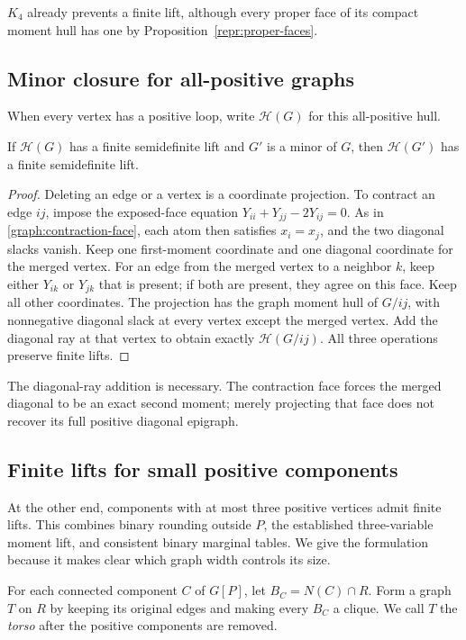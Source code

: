 $K_4$ already prevents a finite lift, although every proper face of its
compact moment hull has one by Proposition~\ref{repr:proper-faces}.

\subsection{Minor closure for all-positive graphs}

When every vertex has a positive loop, write $\mathcal H(G)$ for this
all-positive hull.

\begin{proposition}\label{graph:minor-closure}
If $\mathcal H(G)$ has a finite semidefinite lift and $G'$ is a minor of $G$,
then $\mathcal H(G')$ has a finite semidefinite lift.
\end{proposition}
\begin{proof}
Deleting an edge or a vertex is a coordinate projection. To contract an
edge $ij$, impose the exposed-face equation
$Y_{ii}+Y_{jj}-2Y_{ij}=0$. As in
\eqref{graph:contraction-face}, each atom then satisfies $x_i=x_j$, and
the two diagonal slacks vanish. Keep one first-moment coordinate and one
diagonal coordinate for the merged vertex. For an edge from the merged
vertex to a neighbor $k$, keep either $Y_{ik}$ or $Y_{jk}$ that is present;
if both are present, they agree on this face. Keep all other coordinates.
The projection has the graph moment hull of $G/ij$, with nonnegative
diagonal slack at every vertex except the merged vertex. Add the diagonal
ray at that vertex to obtain exactly $\mathcal H(G/ij)$.
All three operations preserve finite lifts.
\end{proof}

The diagonal-ray addition is necessary. The contraction face forces the
merged diagonal to be an exact second moment; merely projecting that face
does not recover its full positive diagonal epigraph.

\subsection{Finite lifts for small positive components}

At the other end, components with at most three positive vertices admit
finite lifts. This combines binary rounding outside $P$, the established
three-variable moment lift, and consistent binary marginal tables.
We give the formulation because it makes clear which graph width controls
its size.

For each connected component $C$ of $G[P]$, let
$B_C=N(C)\cap R$. Form a graph $T$ on $R$ by keeping its original edges
and making every $B_C$ a clique. We call $T$ the \emph{torso} after the
positive components are removed.

